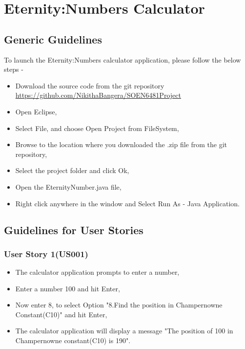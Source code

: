 \documentclass[12pt, a4paper]{report}
\begin{document}
\chapter{Eternity:Numbers Calculator}

\section{Generic Guidelines}

\quad To launch the Eternity:Numbers calculator application, please follow the below steps - 

\begin{itemize}
    \item Download the source code from the git repository \newline \underline{https://github.com/NikithaBangera/SOEN6481Project}
    \item Open Eclipse,
    \item Select File, and choose Open Project from FileSystem,
    \item Browse to the location where you downloaded the .zip file from the git repository,
    \item Select the project folder and click Ok,
    \item Open the EternityNumber.java file,
    \item Right click anywhere in the window and Select Run As - Java Application.
\end{itemize} 

\section{Guidelines for User Stories}

\subsection{User Story 1(US001)}
\begin{itemize}
    \item The calculator application prompts to enter a number,
    \item Enter a number 100 and hit Enter,
    \item Now enter 8, to select Option "8.Find the position in Champernowne Constant(C10)" and hit Enter,
    \item The calculator application will display a message "The position of 100 in Champernowne constant(C10) is 190".
\end{itemize}
\end{document}

